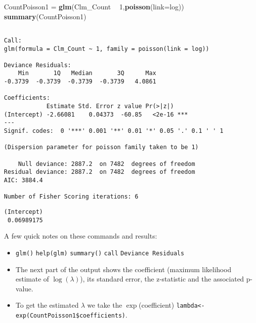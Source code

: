 \documentclass[]{book}
\newenvironment{Shaded}{\begin{snugshade}}{\end{snugshade}}
\newcommand{\KeywordTok}[1]{\textcolor[rgb]{0.13,0.29,0.53}{\textbf{#1}}}
\newcommand{\DataTypeTok}[1]{\textcolor[rgb]{0.13,0.29,0.53}{#1}}
\newcommand{\DecValTok}[1]{\textcolor[rgb]{0.00,0.00,0.81}{#1}}
\newcommand{\StringTok}[1]{\textcolor[rgb]{0.31,0.60,0.02}{#1}}
\newcommand{\OperatorTok}[1]{\textcolor[rgb]{0.81,0.36,0.00}{\textbf{#1}}}
\newcommand{\NormalTok}[1]{#1}
\providecommand{\tightlist}{%
  \setlength{\itemsep}{0pt}\setlength{\parskip}{0pt}}
\theoremstyle{definition}
\theoremstyle{definition}
\theoremstyle{definition}
\theoremstyle{remark}
\begin{document}
\begin{Shaded}
\begin{Highlighting}[]
\NormalTok{CountPoisson1 =}\StringTok{ }\KeywordTok{glm}\NormalTok{(Clm_Count }\OperatorTok{~}\StringTok{ }\DecValTok{1}\NormalTok{,}\KeywordTok{poisson}\NormalTok{(}\DataTypeTok{link=}\NormalTok{log))}
\KeywordTok{summary}\NormalTok{(CountPoisson1)}
\end{Highlighting}
\end{Shaded}

\begin{verbatim}

Call:
glm(formula = Clm_Count ~ 1, family = poisson(link = log))

Deviance Residuals: 
    Min       1Q   Median       3Q      Max  
-0.3739  -0.3739  -0.3739  -0.3739   4.0861  

Coefficients:
            Estimate Std. Error z value Pr(>|z|)    
(Intercept) -2.66081    0.04373  -60.85   <2e-16 ***
---
Signif. codes:  0 '***' 0.001 '**' 0.01 '*' 0.05 '.' 0.1 ' ' 1

(Dispersion parameter for poisson family taken to be 1)

    Null deviance: 2887.2  on 7482  degrees of freedom
Residual deviance: 2887.2  on 7482  degrees of freedom
AIC: 3884.4

Number of Fisher Scoring iterations: 6
\end{verbatim}

\begin{Shaded}
\end{Shaded}

\begin{verbatim}
(Intercept) 
 0.06989175 
\end{verbatim}

A few quick notes on these commands and results:

\begin{itemize}
\tightlist
\item
  \texttt{glm()} \texttt{help(glm)} \texttt{summary()} \texttt{call}
  \texttt{Deviance\ Residuals}
\item
  The next part of the output shows the coefficient (maximum likelihood
  estimate of \(\log(\lambda)\)), its standard error, the z-statistic
  and the associated p-value.
\item
  To get the estimated \(\lambda\) we take the \(\exp\)(coefficient)
  \texttt{lambda\textless{}-exp(CountPoisson1\$coefficients)}.
\end{itemize}
\end{document}
